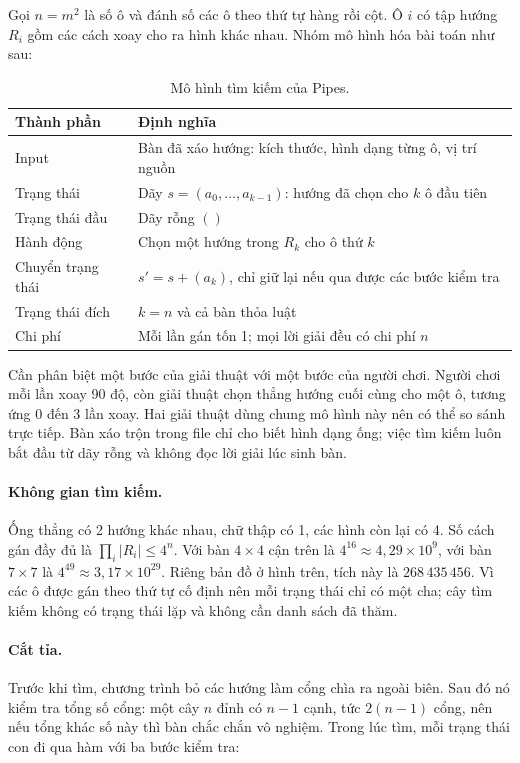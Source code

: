 Gọi $n=m^2$ là số ô và đánh số các ô theo thứ tự hàng rồi cột. Ô $i$ có tập
hướng $R_i$ gồm các cách xoay cho ra hình khác nhau. Nhóm mô hình hóa bài
toán như sau:

\begin{table}[H]
\centering\small
\begin{tabular}{@{}p{}p{}@{}}
\toprule
Thành phần & Định nghĩa\\
\midrule
Input & Bàn đã xáo hướng: kích thước, hình dạng từng ô, vị trí nguồn\\
Trạng thái & Dãy $s=(a_0,\dots,a_{k-1})$: hướng đã chọn cho $k$ ô đầu tiên\\
Trạng thái đầu & Dãy rỗng $()$\\
Hành động & Chọn một hướng trong $R_k$ cho ô thứ $k$\\
Chuyển trạng thái & $s'=s+(a_k)$, chỉ giữ lại nếu qua được các bước kiểm tra\\
Trạng thái đích & $k=n$ và cả bàn thỏa luật\\
Chi phí & Mỗi lần gán tốn 1; mọi lời giải đều có chi phí $n$\\
\bottomrule
\end{tabular}
\caption{Mô hình tìm kiếm của Pipes.}
\end{table}

Cần phân biệt một bước của giải thuật với một bước của người chơi. Người chơi
mỗi lần xoay 90 độ, còn giải thuật chọn thẳng hướng cuối cùng cho một ô, tương
ứng 0 đến 3 lần xoay. Hai giải thuật dùng chung mô hình này nên có thể so sánh
trực tiếp. Bàn xáo trộn trong file chỉ cho biết hình dạng ống; việc tìm kiếm
luôn bắt đầu từ dãy rỗng và không đọc lời giải lúc sinh bàn.

\paragraph{Không gian tìm kiếm.}
Ống thẳng có 2 hướng khác nhau, chữ thập có 1, các hình còn lại có 4. Số cách
gán đầy đủ là $\prod_i|R_i|\le 4^n$. Với bàn $4\times4$ cận trên là
$4^{16}\approx4{,}29\times10^9$, với bàn $7\times7$ là
$4^{49}\approx3{,}17\times10^{29}$. Riêng bản đồ ở hình trên, tích này là
$268\,435\,456$. Vì các ô được gán theo thứ tự cố định nên mỗi trạng thái chỉ
có một cha; cây tìm kiếm không có trạng thái lặp và không cần danh sách đã thăm.

\paragraph{Cắt tỉa.}
Trước khi tìm, chương trình bỏ các hướng làm cổng chìa ra ngoài biên. Sau đó
nó kiểm tra tổng số cổng: một cây $n$ đỉnh có $n-1$ cạnh, tức $2(n-1)$ cổng,
nên nếu tổng khác số này thì bàn chắc chắn vô nghiệm. Trong lúc tìm, mỗi trạng
thái con đi qua hàm  với ba bước kiểm tra:

